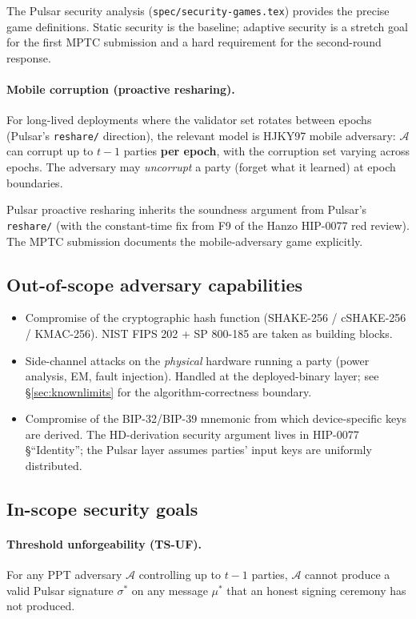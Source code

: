 The Pulsar security analysis (\texttt{spec/security-games.tex})
provides the precise game definitions. Static security is the
baseline; adaptive security is a stretch goal for the first MPTC
submission and a hard requirement for the second-round response.

\paragraph{Mobile corruption (proactive resharing).}
For long-lived deployments where the validator set rotates between
epochs (Pulsar's \texttt{reshare/} direction), the relevant model is
HJKY97 mobile adversary: $\mathcal{A}$ can corrupt up to $t-1$
parties \textbf{per epoch}, with the corruption set varying across
epochs. The adversary may \emph{uncorrupt} a party (forget what it
learned) at epoch boundaries.

Pulsar proactive resharing inherits the soundness argument from
Pulsar's \texttt{reshare/} (with the constant-time fix from F9 of
the Hanzo HIP-0077 red review). The MPTC submission documents the
mobile-adversary game explicitly.

\subsection{Out-of-scope adversary capabilities}

\begin{itemize}[leftmargin=*, itemsep=0pt]
\item Compromise of the cryptographic hash function (SHAKE-256 /
cSHAKE-256 / KMAC-256). NIST FIPS 202 + SP 800-185 are taken as
building blocks.
\item Side-channel attacks on the \emph{physical} hardware running a
party (power analysis, EM, fault injection). Handled at the
deployed-binary layer; see \S\ref{sec:knownlimits} for the
algorithm-correctness boundary.
\item Compromise of the BIP-32/BIP-39 mnemonic from which
device-specific keys are derived. The HD-derivation security
argument lives in HIP-0077 \S``Identity''; the Pulsar layer
assumes parties' input keys are uniformly distributed.
\end{itemize}

\subsection{In-scope security goals}

\paragraph{Threshold unforgeability (TS-UF).}
For any PPT adversary $\mathcal{A}$ controlling up to $t-1$ parties,
$\mathcal{A}$ cannot produce a valid Pulsar signature $\sigma^*$
on any message $\mu^*$ that an honest signing ceremony has not
produced.

